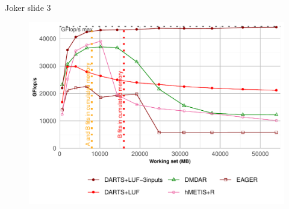 \documentclass{libs/ufc_format}
\begin{document}
\begin{frame}[noframenumbering]{Joker slide 3}
    \begin{figure}
        \centering
        \includegraphics[scale=0.3]{Images/GF_dynamic_data_aware_no_hfp_gemini-1-fgcs_4GPU_M3D.pdf}
    \end{figure}
\end{frame}
\end{document}
